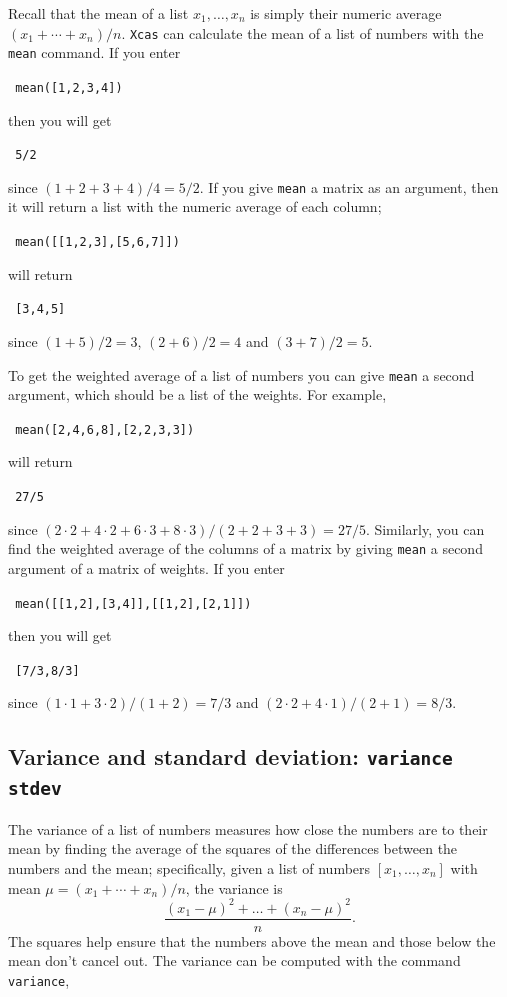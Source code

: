 \documentclass[a4paper,11pt]{book}
\begin{document}
Recall that the mean of a list $x_1,\dots,x_n$ is simply their numeric
average $(x_1 + \cdots + x_n)/n$.  \texttt{Xcas} can calculate the
mean of a list of numbers with the \texttt{mean} command.
If you enter 
\begin{center}
  \tt
  mean([1,2,3,4])
\end{center}
then you will get
\begin{center}
  \tt 
  5/2
\end{center}
since $(1+2+3+4)/4 = 5/2$.
If you give \texttt{mean} a matrix as an argument, then it will return a
list with the numeric average of each column;
\begin{center}
  \tt
  mean([[1,2,3],[5,6,7]])  
\end{center}
will return
\begin{center}
  \tt
  [3,4,5]
\end{center}
since $(1+5)/2 = 3$, $(2+6)/2 = 4$ and $(3 + 7)/2 = 5$.

To get the weighted average of a list of numbers you can give
\texttt{mean} a second argument, which should be a list of the
weights.  For example,
\begin{center}
  \tt
  mean([2,4,6,8],[2,2,3,3])
\end{center}
will return
\begin{center}
  \tt
  27/5
\end{center}
since $(2\cdot 2 + 4\cdot 2 + 6\cdot 3 + 8\cdot 3)/(2 + 2 + 3 + 3) =
27/5$.
Similarly, you can find the weighted average of the columns of a
matrix by giving \texttt{mean} a second argument of a matrix of
weights.  If you enter
\begin{center}
  \tt
  mean([[1,2],[3,4]],[[1,2],[2,1]])
\end{center}
then you will get
\begin{center}
  \tt
  [7/3,8/3]
\end{center}
since $(1\cdot 1 + 3\cdot 2)/(1+2) = 7/3$ and $(2\cdot 2 + 4\cdot 1)/(2 +
1) = 8/3$.

\subsection{Variance and standard deviation: \texttt{variance} \texttt{stdev}}

The variance of a list of numbers measures how close the numbers are
to their mean by finding the average of the squares of the
differences between the numbers and the mean; specifically,
given a list of numbers $[x_1,\dots,x_n]$ with mean $\mu = (x_1 +
\cdots + x_n)/n$, the variance is
\[
\frac{(x_1 - \mu)^2 + \dots + (x_n - \mu)^2}{n}.
\]
The squares help ensure that the numbers above the mean and those
below the mean don't cancel out.  The variance can be computed with
the command \texttt{variance},
\end{document}
